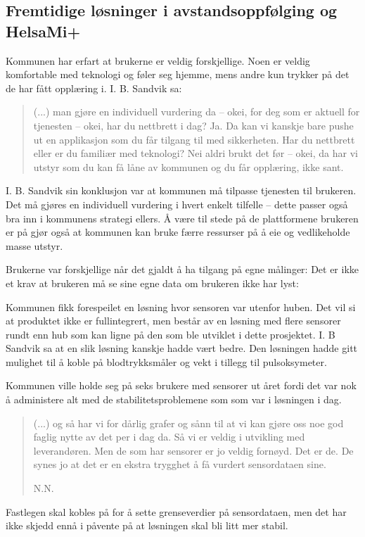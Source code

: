 \subsection{Fremtidige løsninger i avstandsoppfølging og HelsaMi+}
Kommunen har erfart at brukerne er veldig forskjellige. Noen er veldig komfortable med teknologi og føler seg hjemme, mens andre
kun trykker på det de har fått opplæring i. I. B. Sandvik sa:
\blockquote{
(...) man gjøre en individuell vurdering da -- okei, for deg som er aktuell for tjenesten -- okei, har du nettbrett i dag? Ja.
Da kan vi kanskje bare pushe ut en applikasjon som
du får tilgang til med sikkerheten. Har du nettbrett eller er du familiær med teknologi? Nei aldri brukt det før -- okei,
da har vi utstyr som du kan få låne av kommunen og du får opplæring, ikke sant.
}

I. B. Sandvik sin konklusjon var at kommunen må tilpasse tjenesten til brukeren. Det må gjøres en individuell vurdering i hvert enkelt tilfelle --
dette passer også bra inn i kommunens strategi ellers. Å være til stede på de plattformene brukeren er på gjør også at kommunen kan
bruke færre ressurser på å eie og vedlikeholde masse utstyr.

Brukerne var forskjellige når det gjaldt å ha tilgang på egne målinger: 
Det er ikke et krav at brukeren må se sine egne data om brukeren ikke har lyst: 

Kommunen fikk forespeilet en løsning hvor sensoren var utenfor huben. Det vil si at produktet ikke er fullintegrert, men består
av en løsning med flere sensorer rundt enn hub som kan ligne på den som ble utviklet i dette prosjektet. I. B Sandvik sa
at en slik løsning kanskje hadde vært bedre. Den løsningen hadde gitt mulighet til å koble på blodtrykksmåler og vekt i tillegg til
pulsoksymeter.

Kommunen ville holde seg på seks brukere med sensorer ut året fordi det var nok å administere alt med de stabilitetsproblemene som
som var i løsningen i dag.
\blockquote[N.N.]{(...) og så har vi for dårlig grafer og sånn til at vi kan gjøre oss noe god faglig nytte av det per i dag da. Så vi
    er veldig i utvikling med leverandøren. Men de som har sensorer er jo veldig fornøyd. Det er de.
De synes jo at det er en ekstra trygghet å få vurdert sensordataen sine.} Fastlegen skal kobles på for å sette grenseverdier på sensordataen,
men det har ikke skjedd ennå i påvente på at løsningen skal bli litt mer stabil.


